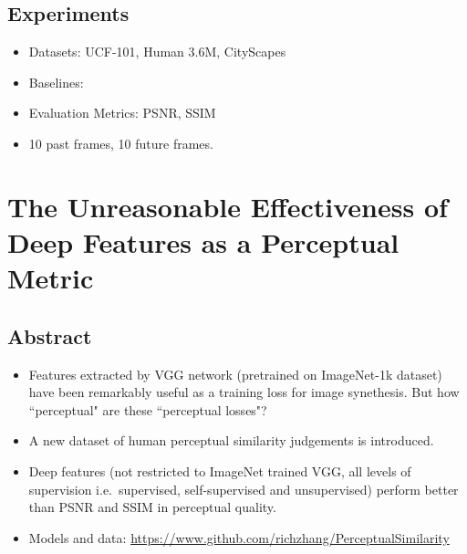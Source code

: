 \documentclass{article}
\begin{document}
    \subsection{Experiments}\label{subsec:Structure_Preserving_Video_Prediction:experiments}
    \begin{itemize}
        \item Datasets: UCF-101, Human 3.6M, CityScapes
        \item Baselines:
        \item Evaluation Metrics: PSNR, SSIM
        \item 10 past frames, 10 future frames.
    \end{itemize}
    \newpage


    \section{The Unreasonable Effectiveness of Deep Features as a Perceptual Metric}\label{sec:The_Unreasonable_Effectiveness_of_Deep_Features_as_a_Perceptual_Metric}
    \subsection*{Abstract}
    \begin{itemize}
        \item Features extracted by VGG network (pretrained on ImageNet-1k dataset) have been remarkably useful as a training loss for image synethesis.
        But how ``perceptual" are these ``perceptual losses"?
        \item A new dataset of human perceptual similarity judgements is introduced.
        \item Deep features (not restricted to ImageNet trained VGG, all levels of supervision i.e.\ supervised, self-supervised and unsupervised) perform better than PSNR and SSIM in perceptual quality.
        \item Models and data: \url{https://www.github.com/richzhang/PerceptualSimilarity}
    \end{itemize}
\end{document}
